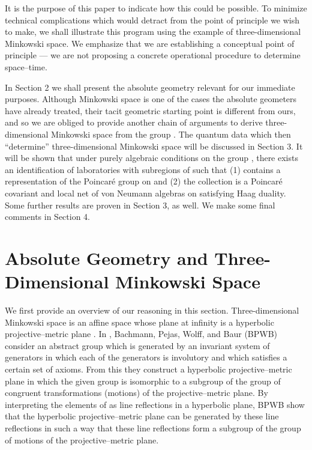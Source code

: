 \documentclass[a4paper,twoside,12pt]{article}
\def\As{{\cal A}}
\def\Js{{\cal J}}
\def\RR{\textnormal{{\rm I \hskip -5.75pt R}}}
\begin{document}
     It is the purpose of this paper to indicate how this could be
possible. To minimize technical complications which would detract from the
point of principle we wish to make, we shall illustrate this program
using the example of three-dimensional Minkowski space. We emphasize 
that we are establishing a conceptual point of principle --- we are
not proposing a concrete operational procedure to determine space--time.

     In Section 2 we shall present the absolute geometry relevant for
our immediate purposes. Although Minkowski space is one of the cases
the absolute geometers have already treated, their tacit geometric
starting point is different from ours, and so we are obliged to
provide another chain of arguments to derive three-dimensional
Minkowski space from the group \myHighlight{$\Js$}\coordHE{}. The quantum data which then
``determine'' three-dimensional Minkowski space will be discussed in
Section 3. It will be shown that under purely algebraic conditions on
the group \myHighlight{$\Js$}\coordHE{}, there exists an identification of laboratories \coordHE{} with subregions \coordHE{} of \myHighlight{$\RR^3$}\coordHE{} such that (1) \myHighlight{$\Js$}\coordHE{} contains a
representation of the Poincar\'e group on \myHighlight{$\RR^3$}\coordHE{} and (2) the
collection \myHighlight{$\{\As(W_i)\}_{i\in I}$}\coordHE{} is a Poincar\'e covariant and local
net of von Neumann algebras on \myHighlight{$\RR^3$}\coordHE{} satisfying Haag duality. Some
further results are proven in Section 3, as well. We make some final
comments in Section 4.


\section{Absolute Geometry and Three-Dimensional Minkowski Space}

     We first provide an overview of our reasoning in this section.
Three-dimensional Minkowski space is an affine space whose plane
at infinity is a hyperbolic projective--metric plane \cite{Cox1}. In
\cite{BBPW}, Bachmann, Pejas, Wolff, and Baur (BPWB) consider an abstract
group \coordHE{} which is generated by an invariant system \coordHE{}
of generators in which each of the generators is involutory and which
satisfies a certain set of axioms. From this they construct a hyperbolic
projective--metric plane in which the given group \coordHE{} is
isomorphic to a subgroup of the group of congruent transformations
(motions) of the projective--metric plane. By interpreting the elements
of \coordHE{} as line reflections in a hyperbolic plane,
BPWB show that the hyperbolic projective--metric plane can be generated
by these line reflections in such a way that these line reflections
form a subgroup of the group of motions of the projective--metric plane.
\end{document}
